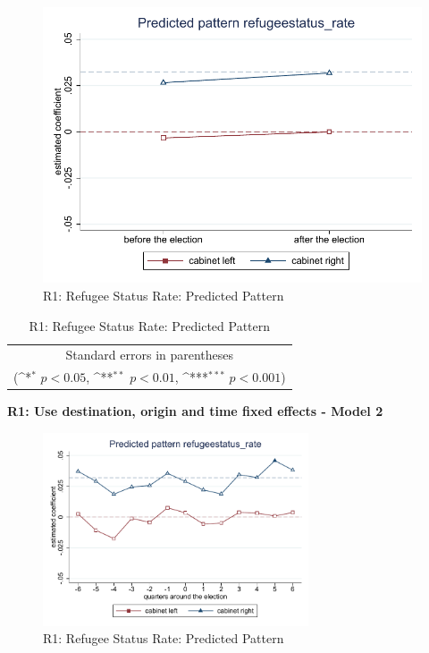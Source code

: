 \documentclass[10pt,a4paper]{scrartcl}
\begin{document}
\begin{figure}[!ht]
	\centering
	\includegraphics[width=1\textwidth]{figures_edited/refugeestatus_rate_graph1_R1.pdf}
	\caption{R1: Refugee Status Rate: Predicted Pattern}
\end{figure}

\begin{table}[!ht]\centering
	\renewcommand{\arraystretch}{1.25}
	\def\sym#1{\ifmmode^{#1}\else\(^{#1}\)\fi}
	\caption{R1: Refugee Status Rate: Predicted Pattern}
	\begin{tabular}{l*{2}{c}}
		\hline\hline
		
		\hline\hline
		\multicolumn{3}{c}{\footnotesize Standard errors in parentheses} \\
		\multicolumn{3}{c}{\footnotesize (\sym{*} \(p<0.05\), \sym{**} \(p<0.01\), \sym{***} \(p<0.001\))}\\
	\end{tabular}
\end{table}

\clearpage
\textbf{ R1: Use destination, origin and time fixed effects - Model 2}
\begin{figure}[!ht]
	\centering
	\includegraphics[width=0.7\textwidth]{figures_edited/refugeestatus_rate_graph2_R1.pdf}
	\caption{R1: Refugee Status Rate: Predicted Pattern}
\end{figure}
\end{document}
